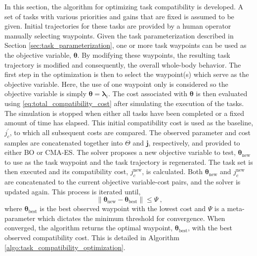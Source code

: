 \documentclass[12pt,a4paper,twoside]{article}
\newcommand{\bs}[1]{\boldsymbol{#1}}
\newcommand{\blam}{\bs{\lambda}}
\newcommand{\tc}{\ \text{,}}
\newcommand{\obj}{\bs{\theta}}
\newcommand{\Obj}{\Theta}
\begin{document}
    In this section, the algorithm for optimizing task compatibility is developed. A set of tasks with various priorities and gains that are fixed is assumed to be given. Initial trajectories for these tasks are provided by a human operator manually selecting waypoints. Given the task parameterization described in Section \ref{sec:task_parameterization}, one or more task waypoints can be used as the objective variable, $\obj$. By modifying these waypoints, the resulting task trajectory is modified and consequently, the overall whole-body behavior. The first step in the optimization is then to select the waypoint(s) which serve as the objective variable. Here, the use of one waypoint only is considered so the objective variable is simply $\obj = \blam_{i}$. The cost associated with $\obj$ is then evaluated using \eqref{eq:total_compatibility_cost} after simulating the execution of the tasks. The simulation is stopped when either all tasks have been completed or a fixed amount of time has elapsed. This initial compatibility cost is used as the baseline, $j_{c}^{\prime}$, to which all subsequent costs are compared. The observed parameter and cost samples are concatenated together into $\Obj$ and $\bs{j}$, respectively, and provided to either BO or CMA-ES.
    The solver proposes a new objective variable to test, $\obj_{\text{new}}$ to use as the task waypoint and the task trajectory is regenerated. The task set is then executed and its compatibility cost, $j_{c}^{\text{new}}$, is calculated. Both $\obj_{\text{new}}$ and $j_{c}^{\text{new}}$ are concatenated to the current objective variable-cost pairs, and the solver is updated again. This process is iterated until,
        \begin{equation}
            \left\| \obj_{\text{new}} - \obj_{\text{best}} \right\| \leq \Psi \tc
            \label{eq:convergence_criterion}
        \end{equation}
        where $\obj_{\text{best}}$ is the best observed waypoint with the lowest cost and $\Psi$ is a meta-parameter which dictates the minimum threshold for convergence. When converged, the algorithm returns the optimal waypoint, $\obj_{\text{best}}$, with the best observed compatibility cost. This is detailed in Algorithm \ref{algo:task_compatibility_optimization}.
\end{document}
